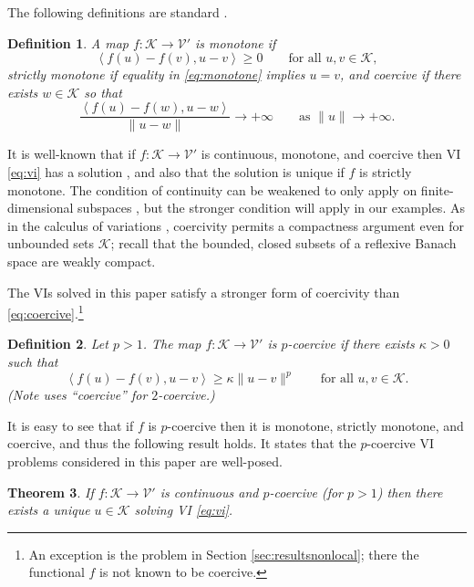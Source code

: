 \documentclass[letterpaper,final,12pt,reqno]{amsart}
\theoremstyle{cstyle}
\newtheorem{theorem}{Theorem}
\theoremstyle{dstyle}
\newtheorem{definition}[theorem]{Definition}
\numberwithin{equation}{section}
\numberwithin{figure}{section}
\numberwithin{table}{section}
\numberwithin{theorem}{section}
\newcommand{\cK}{\mathcal{K}}
\newcommand{\cV}{\mathcal{V}}
\newcommand{\ip}[2]{\left<#1,#2\right>}
\begin{document}
The following definitions are standard \cite{KinderlehrerStampacchia1980}.

\begin{definition} A map $f:\cK \to \cV'$ is \emph{monotone} if
\begin{equation}
\ip{f(u)-f(v)}{u-v} \ge 0 \qquad \text{for all } u,v \in \cK, \label{eq:monotone}
\end{equation}
\emph{strictly monotone} if equality in \eqref{eq:monotone} implies $u=v$, and \emph{coercive} if there exists $w \in \cK$ so that
\begin{equation}
\frac{\ip{f(u)-f(w)}{u-w}}{\|u-w\|} \to +\infty \qquad \text{as } \|u\|\to +\infty. \label{eq:coercive}
\end{equation}
\end{definition}

It is well-known that if $f:\cK \to \cV'$ is continuous, monotone, and coercive then VI \eqref{eq:vi} has a solution \cite[Corollary III.1.8]{KinderlehrerStampacchia1980}, and also that the solution is unique if $f$ is strictly monotone.  The condition of continuity can be weakened to only apply on finite-dimensional subspaces \cite{KinderlehrerStampacchia1980}, but the stronger condition will apply in our examples.  As in the calculus of variations \cite{Evans2010}, coercivity permits a compactness argument even for unbounded sets $\cK$; recall that the bounded, closed subsets of a reflexive Banach space are weakly compact.

The VIs solved in this paper satisfy a stronger form of coercivity than \eqref{eq:coercive}.\footnote{An exception is the problem in Section \ref{sec:resultsnonlocal}; there the functional $f$ is not known to be coercive.}

\begin{definition}  Let $p>1$.  The map $f:\cK \to \cV'$ is \emph{$p$-coercive} if there exists $\kappa>0$ such that
\begin{equation}
\ip{f(u)-f(v)}{u-v} \ge \kappa \|u-v\|^p \qquad \text{for all } u,v \in \cK. \label{eq:pcoercive}
\end{equation}
(Note \cite{Tai2003} uses ``coercive'' for $2$-coercive.)
\end{definition}

It is easy to see that if $f$ is $p$-coercive then it is monotone, strictly monotone, and coercive, and thus the following result holds.  It states that the $p$-coercive VI problems considered in this paper are well-posed.

\begin{theorem}  \label{thm:viwellposed}  If $f:\cK \to \cV'$ is continuous and $p$-coercive (for $p>1$) then there exists a unique $u\in \cK$ solving VI \eqref{eq:vi}.
\end{theorem}
\end{document}
